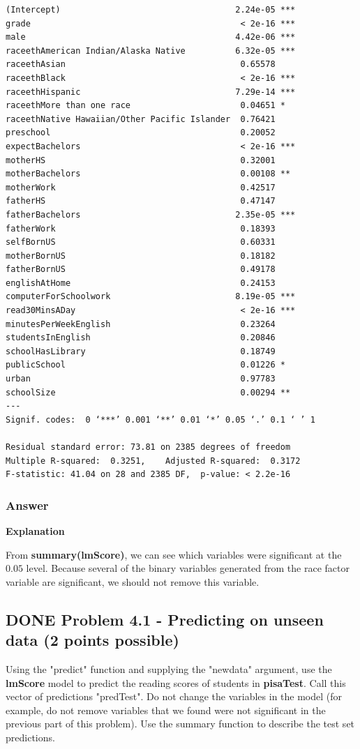 \documentclass[letterpaper, 9pt, onecolumn, twoside, technote, final]{IEEEtran}
\begin{document}
\begin{verbatim}
(Intercept)                                   2.24e-05 ***
grade                                          < 2e-16 ***
male                                          4.42e-06 ***
raceethAmerican Indian/Alaska Native          6.32e-05 ***
raceethAsian                                   0.65578
raceethBlack                                   < 2e-16 ***
raceethHispanic                               7.29e-14 ***
raceethMore than one race                      0.04651 *
raceethNative Hawaiian/Other Pacific Islander  0.76421
preschool                                      0.20052
expectBachelors                                < 2e-16 ***
motherHS                                       0.32001
motherBachelors                                0.00108 **
motherWork                                     0.42517
fatherHS                                       0.47147
fatherBachelors                               2.35e-05 ***
fatherWork                                     0.18393
selfBornUS                                     0.60331
motherBornUS                                   0.18182
fatherBornUS                                   0.49178
englishAtHome                                  0.24153
computerForSchoolwork                         8.19e-05 ***
read30MinsADay                                 < 2e-16 ***
minutesPerWeekEnglish                          0.23264
studentsInEnglish                              0.20846
schoolHasLibrary                               0.18749
publicSchool                                   0.01226 *
urban                                          0.97783
schoolSize                                     0.00294 **
---
Signif. codes:  0 ‘***’ 0.001 ‘**’ 0.01 ‘*’ 0.05 ‘.’ 0.1 ‘ ’ 1

Residual standard error: 73.81 on 2385 degrees of freedom
Multiple R-squared:  0.3251,	Adjusted R-squared:  0.3172
F-statistic: 41.04 on 28 and 2385 DF,  p-value: < 2.2e-16
\end{verbatim}

\subsubsection{Answer}
\label{sec-2-12-1}

\textbf{Explanation}

From \textbf{summary(lmScore)}, we can see which variables were significant at
the $0.05$ level. Because several of the binary variables generated from
the race factor variable are significant, we should not remove this
variable.

\subsection{{\bfseries\sffamily DONE} Problem 4.1 - Predicting on unseen data (2 points possible)}
\label{sec-2-13}
Using the "predict" function and supplying the "newdata" argument, use
the \textbf{lmScore} model to predict the reading scores of students in
\textbf{pisaTest}. Call this vector of predictions "predTest". Do not change
the variables in the model (for example, do not remove variables that
we found were not significant in the previous part of this
problem). Use the summary function to describe the test set
predictions.
\end{document}
